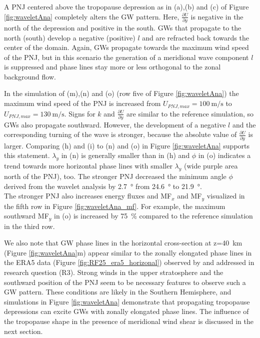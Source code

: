 A PNJ centered above the tropopause depression as in (a),(b) and (c) of Figure \ref{fig:waveletAna} completely alters the GW pattern. Here, $\frac{\partial U}{\partial y}$ is negative in the north of the depression and positive in the south. GWs that propagate to the north (south) develop a negative (positive) $l$ and are refracted back towards the center of the domain. Again, GWs propagate towards the maximum wind speed of the PNJ, but in this scenario the generation of a meridional wave component $l$ is suppressed and phase lines stay more or less orthogonal to the zonal background flow.

In the simulation of (m),(n) and (o) (row five of Figure \ref{fig:waveletAna}) the maximum wind speed of the PNJ is increased from $U_{PNJ,max}=\SI{100}{\meter\per\second}$ to $U_{PNJ,max}=\SI{130}{\meter\per\second}$. Signs for $k$ and $\frac{\partial U}{\partial y}$ are similar to the reference simulation, so GWs also propagate southward. However, the development of a negative $l$ and the corresponding turning of the wave is stronger, because the absolute value of $\frac{\partial U}{\partial y}$ is larger. Comparing (h) and (i) to (n) and (o) in Figure \ref{fig:waveletAna} supports this statement. $\lambda_y$ in (n) is generally smaller than in (h) and $\phi$ in (o) indicates a trend towards more horizontal phase lines with smaller $\lambda_y$ (wide purple area north of the PNJ), too. The stronger PNJ decreased the minimum angle $\phi$ derived from the wavelet analysis by \SI{2.7}{\degree} from \SI{24.6}{\degree} to \SI{21.9}{\degree}. \\
The stronger PNJ also increases energy fluxes and MF$_x$ and MF$_y$ visualized in the fifth row in Figure \ref{fig:waveletAna_mf}. For example, the maximum southward MF$_y$ in (o) is increased by \SI{75}{\percent} compared to the reference simulation in the third row.

We also note that GW phase lines in the horizontal cross-section at z=\SI{40}{\kilo\meter} (Figure \ref{fig:waveletAna}m) appear similar to the zonally elongated phase lines in the ERA5 data (Figure \ref{fig:RF25_era5_horizonal}) observed by \textcite[]{dornbrack_stratospheric_2022} and addressed in research question (R3). Strong winds in the upper stratosphere and the southward position of the PNJ seem to be necessary features to observe such a GW pattern. These conditions are likely in the Southern Hemisphere, and simulations in Figure \ref{fig:waveletAna} demonstrate that propagating tropopause depressions can excite GWs with zonally elongated phase lines. The influence of the tropopause shape in the presence of meridional wind shear is discussed in the next section.

